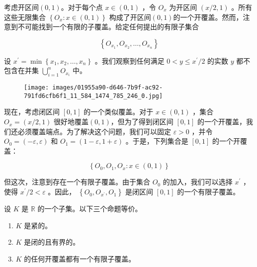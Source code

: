 \begin{Eg}
  \label{eg:3.3.7}
考虑开区间$(0,1)$。对于每个点 \(x \in  \left( {0,1}\right)\) ，令 \({O}_{x}\) 为开区间 \(\left( {x/2,1}\right)\) 。所有这些无限集合 \(\left\{  {{O}_{x} : x \in  \left( {0,1}\right) }\right\}\) 构成了开区间$(0,1)$的一个开覆盖。然而，注意到不可能找到一个有限的子覆盖。给定任何提出的有限子集合

\[
\left\{  {{O}_{{x}_{1}},{O}_{{x}_{2}},\ldots ,{O}_{{x}_{n}}}\right\}
\]

设 \({x}^{\prime } = \min \left\{  {{x}_{1},{x}_{2},\ldots ,{x}_{n}}\right\}\) 。我们观察到任何满足 \(0 < y \leq  {x}^{\prime }/2\) 的实数 \(y\) 都不包含在并集 \(\mathop{\bigcup }\limits_{{i = 1}}^{n}{O}_{{x}_{i}}\) 中。

\begin{figure}[h]
  \centering
  \texttt{[image: images/01955a90-d646-7b9f-ac92-791fd6cfb6f1\_11\_584\_1474\_785\_246\_0.jpg]}
\end{figure}


现在，考虑闭区间 \(\left\lbrack  {0,1}\right\rbrack\) 的一个类似覆盖。对于 \(x \in  \left( {0,1}\right)\) ，集合 \({O}_{x} = \left( {x/2,1}\right)\) 很好地覆盖$(0,1)$，但为了得到闭区间 \(\left\lbrack  {0,1}\right\rbrack\) 的一个开覆盖，我们还必须覆盖端点。为了解决这个问题，我们可以固定 \(\varepsilon  > 0\) ，并令 \({O}_{0} = \left( {-\varepsilon ,\varepsilon }\right)\) 和 \({O}_{1} = \left( {1 - \varepsilon ,1 + \varepsilon }\right)\) 。于是，下列集合是 \(\left\lbrack  {0,1}\right\rbrack\) 的一个开覆盖：

\[
\left\{  {{O}_{0},{O}_{1},{O}_{x} : x \in  \left( {0,1}\right) }\right\}
\]

但这次，注意到存在一个有限子覆盖。由于集合 \({O}_{0}\) 的加入，我们可以选择 \({x}^{\prime }\) ，使得 \({x}^{\prime }/2 < \varepsilon\) 。因此， \(\left\{  {{O}_{0},{O}_{{x}^{\prime }},{O}_{1}}\right\}\) 是闭区间 \(\left\lbrack  {0,1}\right\rbrack\) 的一个有限子覆盖。
  
\end{Eg}

\begin{Thm}
  \label{thm:3.3.8}
  设 \(K\) 是 \(\mathbb{R}\) 的一个子集。以下三个命题等价。
\begin{enumerate}[label = (\roman*)]
\item\label{item:3.3.1}\(K\) 是紧的。
\item \label{item:3.3.2}\(K\) 是闭的且有界的。
\item \label{item:3.3.3} \(K\) 的任何开覆盖都有一个有限子覆盖。
\end{enumerate}
\end{Thm}

